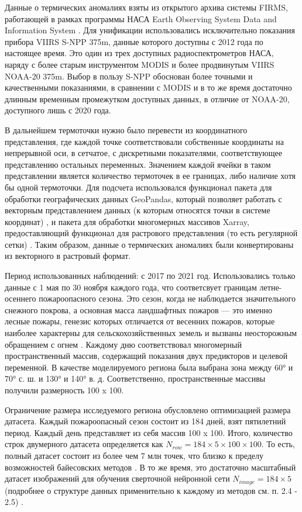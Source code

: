 \documentclass[a4paper,article,14pt]{extarticle}
\begin{document}
Данные о термических аномалиях взяты из открытого архива системы FIRMS, работающей в рамках программы НАСА Earth Observing System Data and Information System  \cite{NASAFIRMSNRTVIIRS3752016}. Для унификации использовались исключительно показания прибора VIIRS S-NPP 375m, данные которого доступны с 2012 года по настоящее время. Это один из трех доступных радиоспектрометров НАСА, наряду с более старым инструментом MODIS и более продвинутым VIIRS NOAA-20 375m. Выбор в пользу S-NPP обоснован более точными и качественными показаниями, в сравнении с MODIS \cite{NASAFIRMSNRTVIIRS3752016} и в то же время достаточно длинным временным промежутком доступных данных, в отличие от NOAA-20, доступного лишь с 2020 года.

В дальнейшем термоточки нужно было перевести из координатного представления, где каждой точке соответствовали собственные координаты на непрерывной оси, в сетчатое, с дискретными показателями, соответствующее представлению остальных переменных. Значением каждой ячейки в таком представлении является количество термоточек в ее границах, либо наличие хотя бы одной термоточки. Для подсчета использовался функционал пакета для обработки географических данных GeoPandas, который позволяет работать с векторным представлением данных (к которым относятся точки в системе координат) \cite{JordahlGeopandasGeopandasV02023}, и пакета для обработки многомерных массивов Xarray, предоставляющий функционал для растрового представления (то есть регулярной сетки) \cite{HoyerXarrayNDLabeled2017}. Таким образом, данные о термических аномалиях были конвертированы из векторного в растровый формат.

Период использованных наблюдений: с 2017 по 2021 год. Использовались только данные с 1 мая по 30 ноября каждого года, что соответсвует границам летне-осеннего пожароопасного сезона. Это сезон, когда не наблюдается значительного снежного покрова, а основная масса ландшафтных пожаров — это именно лесные пожары, генезис которых отличается от весенних пожаров, которые наиболее характерны для сельскохозяйственных земель и вызваны неосторожным обращением с огнем \cite{VesenniePozharyRossii2020}. Каждому дню соответствовал многомерный пространственный массив, содержащий показания двух предикторов и целевой переменной. В качестве моделируемого региона была выбрана зона между 60° и 70° с. ш. и 130° и 140° в. д. Соответственно, пространственные массивы получили размерность 100 x 100.

Ограничение размера исследуемого региона обусловлено оптимизацией размера датасета. Каждый пожароопасный сезон состоит из 184 дней, взят пятилетний период. Каждый день представляет из себя массив 100 x 100. Итого, количество строк двумерного датасета определяется как $N_{row}=184\times5\times100\times100$. То есть, полный датасет состоит из более чем 7 млн точек, что близко к пределу возможностей байесовских методов \cite{PimontPredictionRegionalWildfire2021}. В то же время, это достаточно масштабный датасет изображений для обучения сверточной нейронной сети $N_{image}=184\times5$ (подробнее о структуре данных применительно к каждому из методов см. п. 2.4 - 2.5) \cite{RonnebergerUNetConvolutionalNetworks2015}. 
\end{document}

